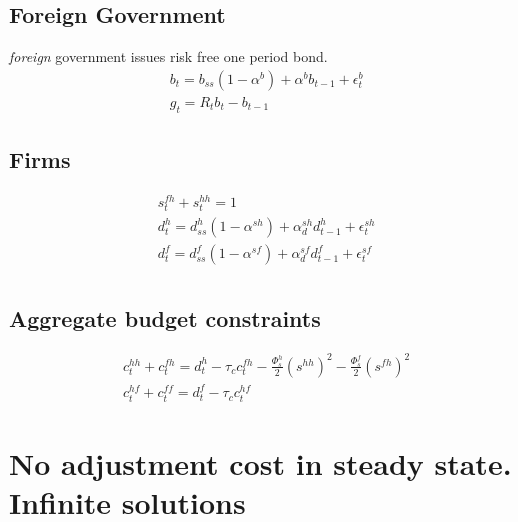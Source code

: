 \documentclass[a4paper]{article}
\begin{document}
\subsection{Foreign Government}
\emph{foreign} government issues risk free one period bond.
\begin{align}
&b_{t} = b_{ss}(1-\alpha^b) + \alpha^b b_{t-1} + \epsilon^b_t\\
&g_t	   = R_t b_{t}-b_{t-1}
\end{align}


\subsection{Firms}
\begin{align}
&s^{fh}_t+s^{hh}_t=1\\
&d^h_t=d^h_{ss} (1-\alpha^{sh}) +\alpha^{sh}_d d^h_{t-1} + \epsilon^{sh}_{t}\\
&d^f_t=d^f_{ss} (1-\alpha^{sf}) +\alpha^{sf}_d d^f_{t-1} + \epsilon^{sf}_{t}\\
\end{align}

\subsection{Aggregate budget constraints}
\begin{align}
&c^{hh}_t+c^{fh}_t=d^h_t - \tau_c c^{fh}_t -\frac{\Phi^{h}_s}{2}(s^{hh})^2 - \frac{\Phi^f_s}{2}(s^{fh})^2\\
&c^{hf}_t + c^{ff}_t = d^f_t - \tau_c c^{hf}_t
\end{align}





















\section{No adjustment cost in steady state. Infinite solutions}\label{AdjustmentCost}
\end{document}
